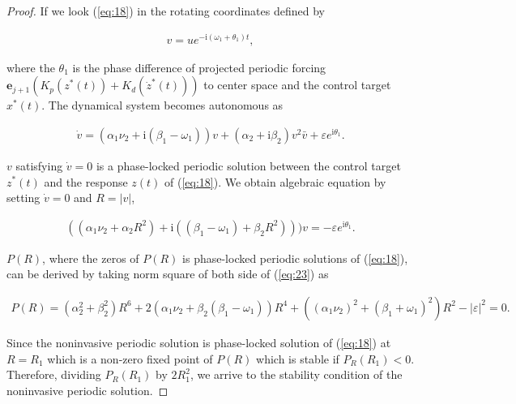 \documentclass[openacc]{rsproca_new}%
\def\epsilon{\varepsilon}
\def\vec#1{\ensuremath{\mathbf{#1}}}
\newcommand{\Eref}[1]{(\ref{#1})}
\begin{document}
\begin{proof}
If we look \Eref{eq:18} in the rotating coordinates defined by

\begin{align}\label{eq:21}
  v=ue^{-\textrm{i}(\omega_1+\theta_1) t},
\end{align}

\noindent where the $\theta_1$ is the phase difference of projected periodic forcing $\vec{e}_{j+1}(K_p(z^*(t))+K_d(\dot z^*(t)))$ to center space and the control target $x^*(t)$. The dynamical system becomes autonomous as

\begin{align}\label{eq:22}
  \dot v=(\alpha_1 \nu_2+\textrm{i}(\beta_1-\omega_1))v+(\alpha_2+\textrm{i}\beta_2)v^2\bar{v}+\epsilon e^{\textrm{i} \theta_1}.
\end{align}

\noindent $v$ satisfying $\dot v=0$ is a phase-locked periodic solution between the control target $z^*(t)$ and the response $z(t)$ of \Eref{eq:18}. We obtain algebraic equation by setting $\dot v=0$ and $R=|v|$,

\begin{align}\label{eq:23}
  ((\alpha_1\nu_2+\alpha_2R^2)+\textrm{i}((\beta_1-\omega_1)+\beta_2 R^2)))v=-\epsilon e^{\textrm{i} \theta_1}.
\end{align}

\noindent $P(R)$, where the zeros of $P(R)$ is phase-locked periodic solutions of \Eref{eq:18}, can be derived by taking norm square of both side of \Eref{eq:23} as

\begin{align}\label{eq:24}
  P(R)=(\alpha_2^2+\beta_2^2)R^6+2(\alpha_1 \nu_2+\beta_2(\beta_1-\omega_1))R^4+((\alpha_1 \nu_2)^2+(\beta_1+\omega_1)^2)R^2-|\epsilon|^2=0.
\end{align}

\noindent Since the noninvasive periodic solution is phase-locked solution of \Eref{eq:18} at $R=R_1$ which is a non-zero fixed point of $P(R)$ which is stable if $P_R(R_1)<0$. Therefore, dividing $P_R(R_1)$ by $2R_1^2$, we arrive to the stability condition of the noninvasive periodic solution.
\end{proof}
\end{document}
